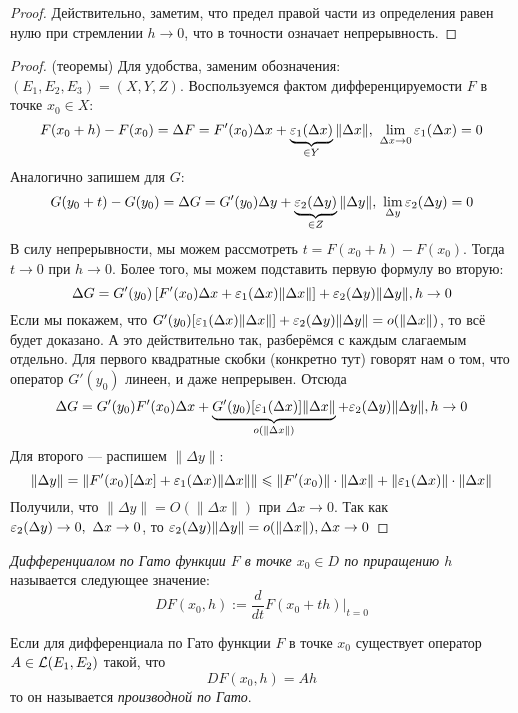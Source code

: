 \begin{proof}
	Действительно, заметим, что предел правой части из определения равен нулю при стремлении $h \to 0$, что в точности означает непрерывность.
\end{proof}

\begin{proof} (теоремы)
	Для удобства, заменим обозначения: $(E_1, E_2, E_3) = (X, Y, Z)$. Воспользуемся фактом дифференцируемости $F$ в точке $x_0 \in X$:
	\[
		F(x_0 + h) - F(x_0) = \Delta F = F'(x_0)\Delta x + \underbrace{\eps_1(\Delta x)}_{\in Y}\|\Delta x\|,\ \lim_{\Delta x \to 0} \eps_1(\Delta x) = 0
	\]
	Аналогично запишем для $G$:
	\[
		G(y_0 + t) - G(y_0) = \Delta G = G'(y_0)\Delta y + \underbrace{\eps_2(\Delta y)}_{\in Z}\|\Delta y\|,\ \lim_{\Delta y} \eps_2(\Delta y) = 0
	\]
	В силу непрерывности, мы можем рассмотреть $t = F(x_0 + h) - F(x_0)$. Тогда $t \to 0$ при $h \to 0$. Более того, мы можем подставить первую формулу во вторую:
	\[
		\Delta G = G'(y_0)\left[F'(x_0)\Delta x + \varepsilon_1(\Delta x)\|\Delta x\|\right] + \varepsilon_2(\Delta y)\|\Delta y\|, h \to 0
	\]
	Если мы покажем, что $G'(y_0)[\varepsilon_1(\Delta x)\|\Delta x\|] + \varepsilon_2(\Delta y)\|\Delta y\| = o(\|\Delta x\|)$, то всё будет доказано. А это действительно так, разберёмся с каждым слагаемым отдельно. Для первого квадратные скобки (конкретно тут) говорят нам о том, что оператор $G'(y_0)$ линеен, и даже непрерывен. Отсюда
	\[
		\Delta G = G'(y_0)F'(x_0)\Delta x + \underbrace{G'(y_0)[\varepsilon_1(\Delta x)]\|\Delta x\|}_{o(\|\Delta x\|)} + \varepsilon_2(\Delta y)\|\Delta y\|, h \to 0
	\]
	Для второго --- распишем $\|\Delta y\|$:
	\[
		\|\Delta y\| = \|F'(x_0)[\Delta x] + \varepsilon_1(\Delta x)\|\Delta x\|\| \leqslant \|F'(x_0)\| \cdot \|\Delta x\| + \|\varepsilon_1(\Delta x)\| \cdot \|\Delta x\|
	\]
	Получили, что $\|\Delta y\| = O(\|\Delta x\|)$ при $\Delta x \to 0$. Так как $\varepsilon_2(\Delta y) \to 0,\ \Delta x \to 0$, то $\varepsilon_2(\Delta y)\|\Delta y\| = o(\|\Delta x\|), \Delta x \to 0$
\end{proof}

\begin{definition}
	\textit{Дифференциалом по Гато функции $F$ в точке $x_0 \in D$ по приращению $h$} называется следующее значение:
	\[
		DF(x_0, h) := \frac{d}{dt}F(x_0 + th)|_{t = 0}
	\]
\end{definition}

\begin{definition}
	Если для дифференциала по Гато функции $F$ в точке $x_0$ существует оператор $A \in \mathcal{L}(E_1, E_2)$ такой, что
	\[
		DF(x_0, h) = Ah
	\]
	то он называется \textit{производной по Гато}.
\end{definition}

